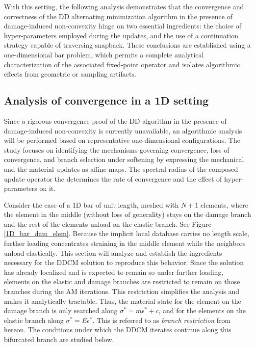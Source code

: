\documentclass[10pt]{cas-sc}
\newcommand{\added}[1]{#1}
\begin{document}
\begin{deletedblock}
	With this setting, the following analysis demonstrates that the convergence and correctness of the DD alternating minimization algorithm in the presence of damage-induced non-convexity hinge on two essential ingredients: the choice of hyper-parameters employed during the updates, and the use of a continuation strategy capable of traversing snapback. These conclusions are established using a one-dimensional bar problem, which permits a complete analytical characterization of the associated fixed-point operator and isolates algorithmic effects from geometric or sampling artifacts.
\end{deletedblock}


\subsection{Analysis of convergence in a 1D setting \label{conv_method_rate}}

\begin{deletedblock}
Since a rigorous convergence proof of the DD algorithm in the presence of damage-induced non-convexity is currently unavailable, an algorithmic analysis will be performed based on representative one-dimensional configurations. The study focuses on identifying the mechanisms governing convergence, loss of convergence, and branch selection under softening by expressing the mechanical and the material updates as affine maps. The spectral radius of the composed update operator the determines the rate of convergence and the effect of hyper-parameters on it.  
\end{deletedblock}

Consider the case of a 1D bar of unit length, meshed with $N+1$ elements, where the element in the middle (without loss of generality) stays on the damage branch and the rest of the elements unload on the elastic branch. See Figure \ref{1D_bar_dam_elem}. \added{Because the implicit local database carries no length scale, further loading concentrates straining in the middle element while the neighbors unload elastically. This section will analyze and establish the ingredients necessary for the DDCM solution to reproduce this behavior. Since the solution has already localized and is expected to remain so under further loading, elements on the elastic and damage branches are restricted to remain on those branches during the AM iterations. This restriction simplifies the analysis and makes it analytically tractable. Thus, the material state for the element on the damage branch is only searched along $\sigma^* = m\epsilon^* + c$, and for the elements on the elastic branch along $\sigma^* = E\epsilon^*$. This is referred to as \textit{branch restriction} from hereon. The conditions under which the DDCM iterates continue along this bifurcated branch are studied below. }
\end{document}

